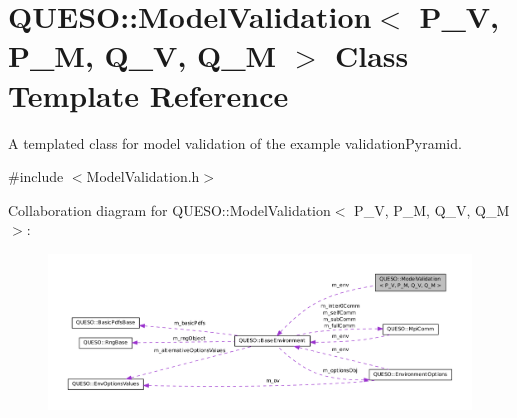 \hypertarget{class_q_u_e_s_o_1_1_model_validation}{\section{Q\-U\-E\-S\-O\-:\-:Model\-Validation$<$ P\-\_\-\-V, P\-\_\-\-M, Q\-\_\-\-V, Q\-\_\-\-M $>$ Class Template Reference}
\label{class_q_u_e_s_o_1_1_model_validation}
}


A templated class for model validation of the example validation\-Pyramid.  




{\ttfamily \#include $<$Model\-Validation.\-h$>$}



Collaboration diagram for Q\-U\-E\-S\-O\-:\-:Model\-Validation$<$ P\-\_\-\-V, P\-\_\-\-M, Q\-\_\-\-V, Q\-\_\-\-M $>$\-:
\nopagebreak
\begin{figure}[H]
\begin{center}
\leavevmode
\includegraphics[width=350pt]{class_q_u_e_s_o_1_1_model_validation__coll__graph}
\end{center}
\end{figure}
